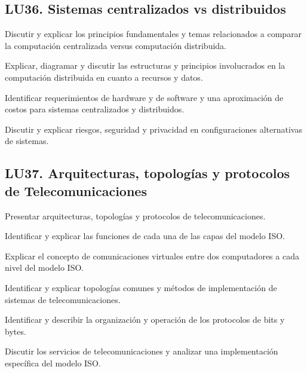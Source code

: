 \subsection{LU36. Sistemas centralizados vs distribuidos}\label{sec:LU36}
\begin{LearningUnit}
\begin{LUGoal}
\item Discutir y explicar los principios fundamentales y temas relacionados a comparar la computación centralizada versus computación distribuida.
\end{LUGoal}

\begin{LUObjective}
\item Explicar, diagramar y discutir las estructuras y principios involucrados en la computación distribuida en cuanto a recursos y datos.
\item Identificar requerimientos de hardware y de software y una aproximación de costos para sistemas centralizados y distribuidos.
\item Discutir y explicar riesgos, seguridad y privacidad en configuraciones alternativas de sistemas.
\end{LUObjective}
\end{LearningUnit}

\subsection{LU37. Arquitecturas, topologías y protocolos de Telecomunicaciones}\label{sec:LU37}
\begin{LearningUnit}
\begin{LUGoal}
\item Presentar arquitecturas, topologías y protocolos de telecomunicaciones.
\end{LUGoal}

\begin{LUObjective}
\item Identificar y explicar las funciones de cada una de las capas del modelo ISO.
\item Explicar el concepto de comunicaciones virtuales entre dos computadores a cada nivel del modelo ISO.
\item Identificar y explicar topologías comunes y métodos de implementación de sistemas de telecomunicaciones.
\item Identificar y describir la organización y operación de los protocolos de bits y bytes.
\item Discutir los servicios de telecomunicaciones y analizar una implementación específica del modelo ISO.
\end{LUObjective}
\end{LearningUnit}

